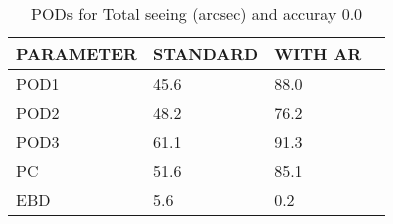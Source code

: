 \begin{table}[]
\begin{center}
\begin{tabular}{|l|l|l|l|}
\hline
\multicolumn{1}{|c|}{\cellcolor[HTML]{C0C0C0}\textbf{PARAMETER}} & \multicolumn{1}{c|}{\cellcolor[HTML]{C0C0C0}\textbf{STANDARD}} & \multicolumn{1}{c|}{\cellcolor[HTML]{C0C0C0}\textbf{WITH AR}} \\
\hline
\cellcolor[HTML]{C0C0C0}POD1  & 45.6                                & 88.0         \\
\cellcolor[HTML]{C0C0C0}POD2  & 48.2                                & 76.2         \\
\cellcolor[HTML]{C0C0C0}POD3  & 61.1                                & 91.3         \\
\cellcolor[HTML]{C0C0C0}PC    & 51.6                                  & 85.1           \\
\cellcolor[HTML]{C0C0C0}EBD   & 5.6                                 & 0.2          \\
\hline
\end{tabular}
\caption{PODs for Total seeing (arcsec) and accuray 0.0}
\end{center}
\end{table}

